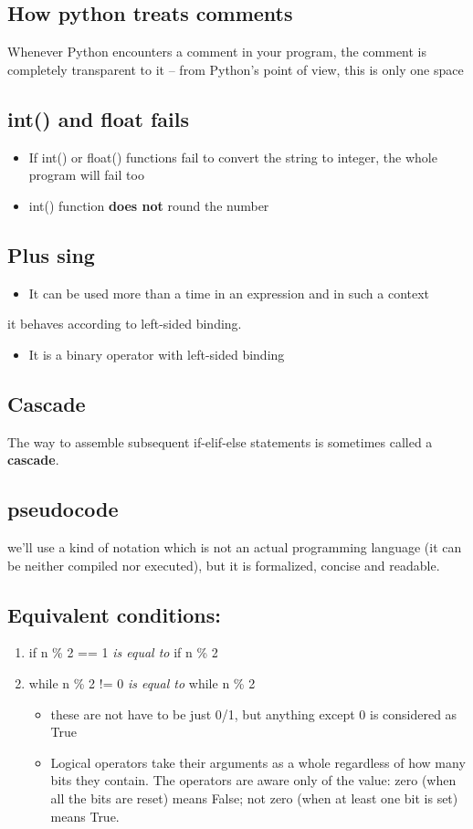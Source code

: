 \documentclass[11pt]{article}
\begin{document}
\subsection{How python treats comments}
\label{sec:orga754db4}
Whenever Python encounters a comment in your program, the comment is
completely transparent to it – from Python’s point of view, this is
only one space
\subsection{int() and float fails}
\label{sec:orga38535f}
\begin{itemize}
\item If int() or float() functions fail to convert the string to integer,
the whole program will fail too
\item int() function \textbf{does not} round the number
\end{itemize}
\subsection{Plus sing}
\label{sec:org8b5563c}
\begin{itemize}
\item It can be used more than a time in an expression and in such a context
\end{itemize}
it behaves according to left-sided binding.
\begin{itemize}
\item It is a binary operator with left-sided binding
\end{itemize}
\subsection{Cascade}
\label{sec:org7f43afc}
The way to assemble subsequent if-elif-else statements is sometimes
called a \textbf{cascade}.
\subsection{pseudocode}
\label{sec:org32638ab}
we’ll use a kind of notation which is not an actual programming
language (it can be neither compiled nor executed), but it is
formalized, concise and readable.
\subsection{Equivalent conditions:}
\label{sec:org269ab76}
\begin{enumerate}
\item if n \% 2 == 1  \emph{is equal to} if n \% 2
\item while n \% 2 != 0 \emph{is equal to} while n \% 2
\begin{itemize}
\item these are not have to be just 0/1, but anything except 0 is
considered as True
\item Logical operators take their arguments as a whole regardless of
how many bits they contain. The operators are aware only of the
value: zero (when all the bits are reset) means False; not zero
(when at least one bit is set) means True.
\end{itemize}
\end{enumerate}
\end{document}
